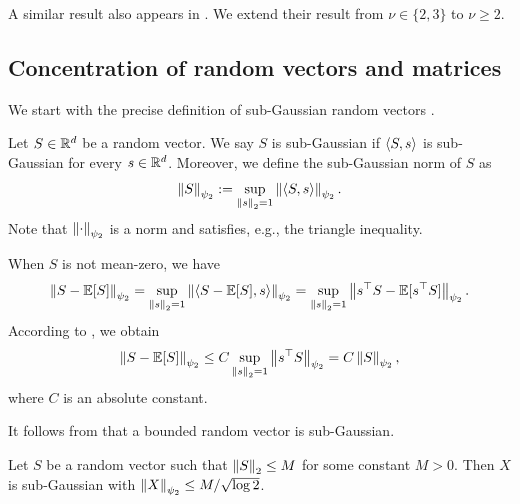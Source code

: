 \begin{remark}
    A similar result also appears in \cite[Prop.~B.4]{ostrovskii2021finite}.
    We extend their result from $\nu \in \{2, 3\}$ to $\nu \ge 2$.
\end{remark}

\subsection{Concentration of random vectors and matrices}
\label{sub:appendix:concentration}

We start with the precise definition of sub-Gaussian random vectors \cite[Chapter 3.4]{vershynin2018high}.

\begin{definition}\label{def:subg_vec}
    Let $S \in {\mathbb R}^d$ be a random vector.
    We say $S$ is sub-Gaussian if ${\langle S, s \rangle}$ is sub-Gaussian for every $s \in {\mathbb R}^d$.
    Moreover, we define the sub-Gaussian norm of $S$ as
    \begin{align*}
        \left\lVert S \right\rVert_{\psi_2} := \sup_{\left\lVert s \right\rVert_2 = 1} \left\lVert {\langle S, s \rangle} \right\rVert_{\psi_2}.
    \end{align*}
    Note that $\left\lVert \cdot \right\rVert_{\psi_2}$ is a norm and satisfies, e.g., the triangle inequality.
\end{definition}

\begin{remark}\label{rmk:centering}
    When $S$ is not mean-zero, we have
    \begin{align*}
        \left\lVert S - \operatorname{\mathbb E}[S] \right\rVert_{\psi_2}
        = \sup_{\left\lVert s \right\rVert_2 = 1} \left\lVert {\langle S - \operatorname{\mathbb E}[S], s \rangle} \right\rVert_{\psi_2}
        = \sup_{\left\lVert s \right\rVert_2 = 1} \left\lVert s^\top S - \operatorname{\mathbb E}[s^\top S] \right\rVert_{\psi_2}.
    \end{align*}
    According to \citet[Lemma 2.6.8]{vershynin2018high}, we obtain
    \begin{align*}
        \left\lVert S - \operatorname{\mathbb E}[S] \right\rVert_{\psi_2} \le C \sup_{\left\lVert s \right\rVert_2 = 1} \left\lVert s^\top S \right\rVert_{\psi_2} = C \left\lVert S \right\rVert_{\psi_2},
    \end{align*}
    where $C$ is an absolute constant.
\end{remark}

It follows from \citet[Eq.~(2.17)]{vershynin2018high} that a bounded random vector is sub-Gaussian.
\begin{lemma}\label{lem:bounded_subG}
    Let $S$ be a random vector such that $\left\lVert S \right\rVert_2 \le M$ for some constant $M > 0$.
    Then $X$ is sub-Gaussian with $\left\lVert X \right\rVert_{\psi_2} \le M/\sqrt{\log{2}}$.
\end{lemma}

